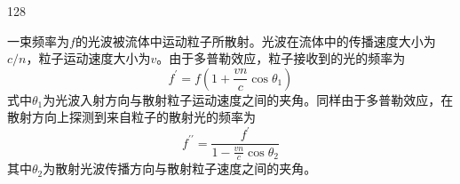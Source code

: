 \begin{solution}{128}
    \begin{subsolution}
        一束频率为$f$的光波被流体中运动粒子所散射。光波在流体中的传播速度大小为$c/n$，粒子运动速度大小为$v$。由于多普勒效应，粒子接收到的光的频率为
        \begin{equation}
            f ^ {\prime} = f \left(1 + \frac {v n}{c} \cos \theta_ {1}\right)
            \label{eq:1.s128}
        \end{equation}
        式中$\theta _ { 1 }$为光波入射方向与散射粒子运动速度之间的夹角。同样由于多普勒效应，在散射方向上探测到来自粒子的散射光的频率为
        \begin{equation}
            f ^ {\prime \prime} = \frac {f ^ {\prime}}{1 - \frac {v n}{c} \cos \theta_ {2}}
            \label{eq:2.s128}
        \end{equation}
        其中$\theta _ { 2 }$为散射光波传播方向与散射粒子速度之间的夹角。


\end{subsolution}
\end{solution}
